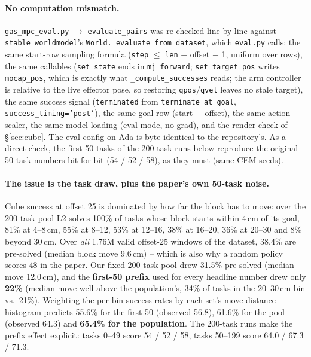 \documentclass[11pt]{article}
\begin{document}
\paragraph{No computation mismatch.} \texttt{gas\_mpc\_eval.py} $\to$ \texttt{evaluate\_pairs}
was re-checked line by line against \texttt{stable\_worldmodel}'s
\texttt{World.\_evaluate\_from\_dataset}, which \texttt{eval.py} calls: the same start-row
sampling formula (\texttt{step} $\le$ \texttt{len} $-$ offset $-$ 1, uniform over rows), the
same callables (\texttt{set\_state} ends in \texttt{mj\_forward}; \texttt{set\_target\_pos}
writes \texttt{mocap\_pos}, which is exactly what \texttt{\_compute\_successes} reads; the
arm controller is relative to the live effector pose, so restoring \texttt{qpos}/\texttt{qvel}
leaves no stale target), the same success signal (\texttt{terminated} from
\texttt{terminate\_at\_goal}, \texttt{success\_timing='post'}), the same goal row (start $+$
offset), the same action scaler, the same model loading (eval mode, no grad), and the render
check of \S\ref{sec:cube}. The eval config on Ada is byte-identical to the repository's.
As a direct check, the first 50 tasks of the 200-task runs below reproduce the original
50-task numbers bit for bit (54 / 52 / 58), as they must (same CEM seeds).

\paragraph{The issue is the task draw, plus the paper's own 50-task noise.} Cube success at
offset 25 is dominated by how far the block has to move: over the 200-task pool L2 solves
100\% of tasks whose block starts within 4\,cm of its goal, 81\% at 4--8\,cm, 55\% at 8--12,
53\% at 12--16, 38\% at 16--20, 36\% at 20--30 and 8\% beyond 30\,cm. Over \emph{all}
1.76M valid offset-25 windows of the dataset, 38.4\% are pre-solved (median block move
9.6\,cm) -- which is also why a random policy scores 48 in the paper. Our fixed 200-task pool
drew 31.5\% pre-solved (median move 12.0\,cm), and the \textbf{first-50 prefix} used for every
headline number drew only \textbf{22\%} (median move well above the population's, 34\% of
tasks in the 20--30\,cm bin vs.\ 21\%). Weighting the per-bin success rates by each set's
move-distance histogram predicts 55.6\% for the first 50 (observed 56.8), 61.6\% for the pool
(observed 64.3) and \textbf{65.4\% for the population}. The 200-task runs make the prefix
effect explicit: tasks 0--49 score 54 / 52 / 58, tasks 50--199 score 64.0 / 67.3 / 71.3.
\end{document}
